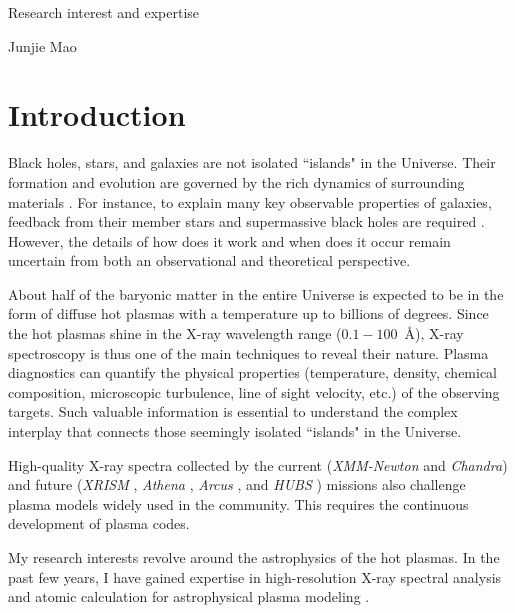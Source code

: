 \documentclass[letterpaper,11pt]{article}
\begin{document}
\begin{center}
    \LARGE{Research interest and expertise}
    \vspace{6pt}

    \Large{Junjie Mao}
\end{center}

\section*{Introduction}
Black holes, stars, and galaxies are not isolated ``islands" in the Universe. Their formation and evolution are governed by the rich dynamics of surrounding materials \cite{tum17}. For instance, to explain many key observable properties of galaxies, feedback from their member stars and supermassive black holes are required \cite{har18}. However, the details of how does it work and when does it occur remain uncertain from both an observational and theoretical perspective.
\vspace{6pt}

About half of the baryonic matter in the entire Universe is expected to be in the form of diffuse hot plasmas with a temperature up to billions of degrees. Since the hot plasmas shine in the X-ray wavelength range ($0.1-100$~\AA), X-ray spectroscopy is thus one of the main techniques to reveal their nature. Plasma diagnostics can quantify the physical properties (temperature, density, chemical composition, microscopic turbulence, line of sight velocity, etc.) of the observing targets. Such valuable information is essential to understand the complex interplay that connects those seemingly isolated ``islands" in the Universe.
\vspace{6pt}

High-quality X-ray spectra collected by the current (\textit{XMM-Newton} and \textit{Chandra}) and future (\textit{XRISM} \cite{tas18}, \textit{Athena} \cite{nan13,bar18}, \textit{Arcus} \cite{smi16}, and \textit{HUBS} \cite{cui20}) missions also challenge plasma models widely used in the community. This requires the continuous development of plasma codes.
\vspace{6pt}

My research interests revolve around the astrophysics of the hot plasmas. In the past few years, I have gained expertise in high-resolution X-ray spectral analysis and atomic calculation for astrophysical plasma modeling \cite{mao19a,mao19b,mao19c}.
\vspace{6pt}
\end{document}
